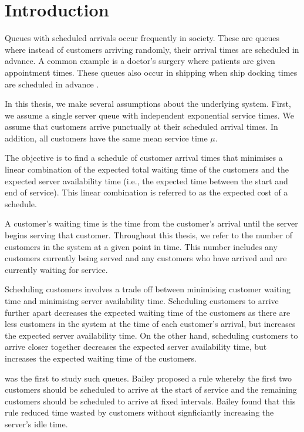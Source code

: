 \chapter{Introduction}
Queues with scheduled arrivals occur frequently in society. These are queues where instead of customers arriving randomly, their arrival times are scheduled in advance. A common example is a doctor's surgery where patients are given appointment times. These queues also occur in shipping when ship docking times are scheduled in advance \citep{Wang2}.

In this thesis, we make several assumptions about the underlying system. First, we assume a single server queue with independent exponential service times. We assume that customers arrive punctually at their scheduled arrival times. In addition, all customers have the same mean service time $\mu$.

The objective is to find a schedule of customer arrival times that minimises a linear combination of the expected total waiting time of the customers and the expected server availability time (i.e., the expected time between the start and end of service). This linear combination is referred to as the expected cost of a schedule.

A customer's waiting time is the time from the customer's arrival until the server begins serving that customer. Throughout this thesis, we refer to the number of customers in the system at a given point in time. This number includes any customers currently being served and any customers who have arrived and are currently waiting for service.

Scheduling customers involves a trade off between minimising customer waiting time and minimising server availability time. Scheduling customers to arrive further apart decreases the expected waiting time of the customers as there are less customers in the system at the time of each customer's arrival, but increases the expected server availability time. On the other hand, scheduling customers to arrive closer together decreases the expected server availability time, but increases the expected waiting time of the customers.

\citet{Bailey} was the first to study such queues. Bailey proposed a rule whereby the first two customers should be scheduled to arrive at the start of service and the remaining customers should be scheduled to arrive at fixed intervals. Bailey found that this rule reduced time wasted by customers without signficiantly increasing the server's idle time.

